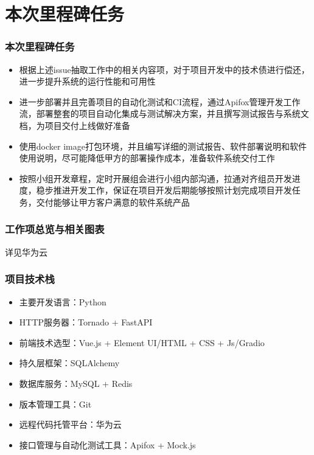 \section{本次里程碑任务}
\begin{frame}
    \frametitle{本次里程碑任务}
    \begin{itemize}
        \item 根据上述issue抽取工作中的相关内容项，对于项目开发中的技术债进行偿还，进一步提升系统的运行性能和可用性
        \item 进一步部署并且完善项目的自动化测试和CI流程，通过Apifox管理开发工作流，部署整套的项目自动化集成与测试解决方案，并且撰写测试报告与系统文档，为项目交付上线做好准备
        \item 使用docker image打包环境，并且编写详细的测试报告、软件部署说明和软件使用说明，尽可能降低甲方的部署操作成本，准备软件系统交付工作
        \item 按照小组开发章程，定时开展组会进行小组内部沟通，拉通对齐组员开发进度，稳步推进开发工作，保证在项目开发后期能够按照计划完成项目开发任务，交付能够让甲方客户满意的软件系统产品
    \end{itemize}
\end{frame}

\begin{frame}
    \frametitle{工作项总览与相关图表}
    详见华为云
\end{frame}

\begin{frame}
    \frametitle{项目技术栈}
    \begin{itemize}
        \item 主要开发语言：Python
        \item HTTP服务器：Tornado + FastAPI
        \item 前端技术选型：Vue.js + Element UI/HTML + CSS + Js/Gradio
        \item 持久层框架：SQLAlchemy
        \item 数据库服务：MySQL + Redis
        \item 版本管理工具：Git
        \item 远程代码托管平台：华为云
        \item 接口管理与自动化测试工具：Apifox + Mock.js
    \end{itemize}
\end{frame}